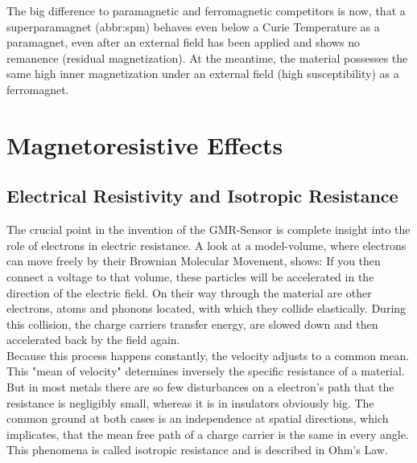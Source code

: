 The big difference to paramagnetic and ferromagnetic competitors is now, that a superparamagnet (\acrshort{abbr:spm}) behaves even below a Curie Temperature as a paramagnet, even after an external field has been applied and shows no remanence (residual magnetization). At the meantime, the material possesses the same high inner magnetization under an external field (high susceptibility) as a ferromagnet.\cite{lit:nano:transport_ferromagnet}
\newpage

\section{Magnetoresistive Effects}
\subsection{Electrical Resistivity and Isotropic Resistance}
The crucial point in the invention of the GMR-Sensor is complete insight into the role of electrons in electric resistance. A look at a model-volume, where electrons can move freely by their Brownian Molecular Movement, shows: If you then connect a voltage to that volume, these particles will be accelerated in the direction of the electric field. On their way through the material are other electrons, atoms and phonons located, with which they collide elastically.\cite{lit:nano:WDE} During this collision, the charge carriers transfer energy, are slowed down and then accelerated back by the field again.\\ Because this process happens constantly, the velocity adjusts to a common mean. This "mean of velocity" determines inversely the specific resistance of a material. But in most metals there are so few disturbances on a electron's path that the resistance is negligibly small, whereas it is in insulators obviously big. The common ground at both cases is an independence at spatial directions, which implicates, that the mean free path of a charge carrier is the same in every angle. This phenomena is called isotropic resistance and is described in Ohm's Law.

